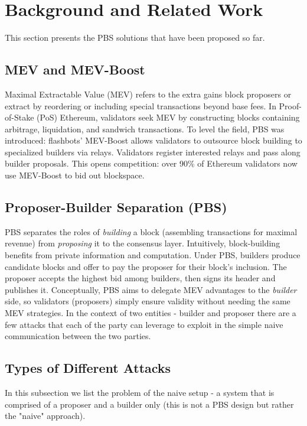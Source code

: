 \section{Background and Related Work}
This section presents the PBS solutions that have been proposed so far.

\subsection{MEV and MEV-Boost}
\label{sec:mev}
Maximal Extractable Value (MEV) refers to the extra gains block proposers or extract by reordering or including special transactions beyond base fees. In Proof-of-Stake (PoS) Ethereum, validators seek MEV by constructing blocks containing arbitrage, liquidation, and sandwich transactions. To level the field, PBS was introduced: flashbots’ MEV-Boost allows validators to outsource block building to specialized builders via relays. Validators register interested relays and pass along builder proposals. This opens competition: over 90\% of Ethereum validators now use MEV-Boost to bid out blockspace.

\subsection{Proposer-Builder Separation (PBS)}
PBS separates the roles of \emph{building} a block (assembling transactions for maximal revenue) from \emph{proposing} it to the consensus layer.  Intuitively, block-building benefits from private information and computation. Under PBS, builders produce candidate blocks and offer to pay the proposer for their block’s inclusion. The proposer accepts the highest bid among builders, then signs its header and publishes it. Conceptually, PBS aims to delegate MEV advantages to the \textit{builder} side, so validators (proposers) simply ensure validity without needing the same MEV strategies. In the context of two entities - builder and proposer there are a few attacks that each of the party can leverage to exploit in the simple naive communication between the two parties.

\subsection{Types of Different Attacks}
\label{subsection:types-of-different-attack}
In this subsection we list the problem of the naive setup - a system that is comprised of a proposer and a builder only (this is not a PBS design but rather the "naive" approach).

